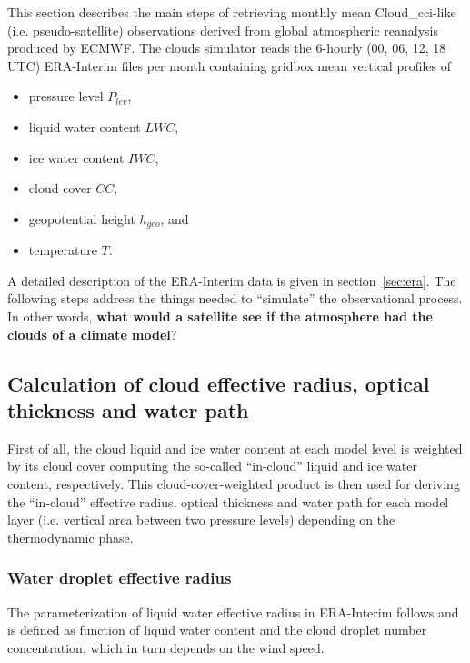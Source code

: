 

This section describes the main steps of retrieving monthly mean 
Cloud\_cci-like (i.e. pseudo-satellite) observations derived from 
global atmospheric reanalysis produced by ECMWF.
The clouds simulator reads the 6-hourly (00, 06, 12, 18 UTC) 
ERA-Interim files per month containing gridbox mean vertical profiles of
\begin{itemize}
    \setlength\itemsep{0.2em}
    \item pressure level $P_{lev}$,
    \item liquid water content $LWC$,
    \item ice water content $IWC$,
    \item cloud cover $CC$,
    \item geopotential height $h_{geo}$, and
    \item temperature $T$.
\end{itemize}
A detailed description of the ERA-Interim data is given in section~\ref{sec:era}.
The following steps address the things needed to ``simulate'' the observational process.
In other words, \textbf{what would a satellite see if the atmosphere had the clouds
of a climate model}?


\subsection{Calculation of cloud effective radius, optical thickness and water path}
First of all, the cloud liquid and ice water content at each model level
is weighted by its cloud cover computing the so-called ``in-cloud'' 
liquid and ice water content, respectively.
This cloud-cover-weighted product is then used for deriving the ``in-cloud''
effective radius, optical thickness and water path for each model layer 
(i.e. vertical area between two pressure levels) depending on the thermodynamic phase.


\subsubsection{Water droplet effective radius}
The parameterization of liquid water effective radius in ERA-Interim 
follows \citet{Martin1994} and is defined as function of 
liquid water content and the cloud droplet number concentration, 
which in turn depends on the wind speed.


